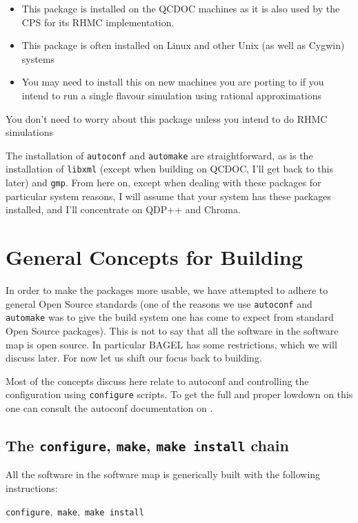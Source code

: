 \documentclass{article}
\begin{document}
\begin{description}
{\begin{itemize}
\item
This package is installed on the QCDOC machines as it is also used by the CPS 
for its RHMC implementation. 
\item
This package is often installed on Linux and other Unix (as well as Cygwin)
systems
\item
You may need to install this on new machines you are porting to if you 
intend to run a single flavour simulation using rational approximations
\end{itemize}
You don't need to worry about this package unless you intend to do RHMC
simulations
}
\end{description}

The installation of {\tt autoconf} and {\tt automake} are straightforward,
as is the installation of {\tt libxml} (except when building on QCDOC, I'll
get back to this later) and {\tt gmp}. From here on, except when dealing with these packages for particular system reasons, I will assume that your system
has these packages installed, and I'll concentrate on QDP++ and Chroma.

\section{General Concepts for Building}
In order to make the packages more usable, we have attempted to adhere
to general Open Source standards (one of the reasons we use {\tt autoconf}
and {\tt automake} was to give the build system one has come to expect
from standard Open Source packages). This is not to say that all the 
software in the software map is open source. In particular BAGEL has
some restrictions, which we will discuss later. For now let us shift 
our focus back to building.

Most of the concepts discuss here relate to autoconf and controlling 
the configuration using {\tt configure} scripts. To get the full and proper
lowdown on this one can consult the autoconf documentation on .

\subsection{The {\tt configure}, {\tt make}, {\tt make install} chain}
All the software in the software map is generically built with the following
instructions:

\hbox{{\tt configure}, {\tt make}, {\tt make install}}
\end{document}
